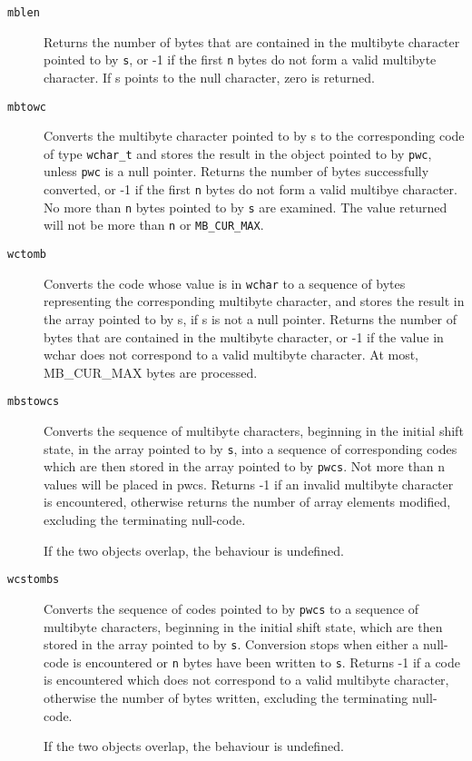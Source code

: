    \begin{description}
    \item[\texttt{mblen}] Returns the number of bytes that  are  contained  in  the multibyte
     character pointed to by \texttt{s}, or -1 if the first
     \texttt{n} bytes do not form a  valid  multibyte  character.   If
     s points to the null character, zero is returned.

    \item[\texttt{mbtowc}] Converts the multibyte character pointed to by s  to  the corresponding
     code of type \texttt{wchar\_t} and stores the result in the object
     pointed to by \texttt{pwc}, unless  \texttt{pwc}  is  a  null
     pointer.    Returns  the  number  of  bytes  successfully converted, or
     -1 if the first \texttt{n} bytes do not form a valid
     multibye character.  No more than \texttt{n} bytes pointed to by
     \texttt{s} are examined.  The value returned will not be more than
     \texttt{n} or \texttt{MB\_CUR\_MAX}.

    \item[\texttt{wctomb}] Converts the code whose value is in
     \texttt{wchar} to  a  sequence of   bytes   representing   the
     corresponding  multibyte character, and stores the result in the array
     pointed  to by  s, if s is not a null pointer.  Returns the number of
     bytes that are contained in the multibyte character, or -1 if the
     value in wchar does not correspond to a valid multibyte  character.  At
     most, MB\_CUR\_MAX  bytes  are processed.

    \item[\texttt{mbstowcs}] 
     Converts the sequence of multibyte characters,  beginning in the
      initial shift state, in the array pointed to by \texttt{s}, into
      a sequence of corresponding  codes  which  are  then stored  in  the
      array pointed to by \texttt{pwcs}. Not more than n values will be
      placed in pwcs.  Returns -1 if an  invalid multibyte
      character is encountered, otherwise returns the number  of  array
      elements   modified,   excluding   the terminating null-code.


     If the two objects overlap, the behaviour is undefined.

    

    \item[\texttt{wcstombs}] 
     Converts the sequence of codes pointed to by  \texttt{pwcs}  to
      a sequence   of  multibyte  characters,  beginning  in  the initial shift
      state, which are then stored in  the  array pointed to by \texttt{s}.
      Conversion stops when either a null-code is encountered  or
      \texttt{n}  bytes  have  been  written  to  \texttt{s}.  Returns
      -1  if  a  code  is  encountered  which does not correspond
      to a valid multibyte character, otherwise  the number  of bytes written,
      excluding the terminating null-code.


     If the two objects overlap, the behaviour is undefined.

    
   \end{description}

